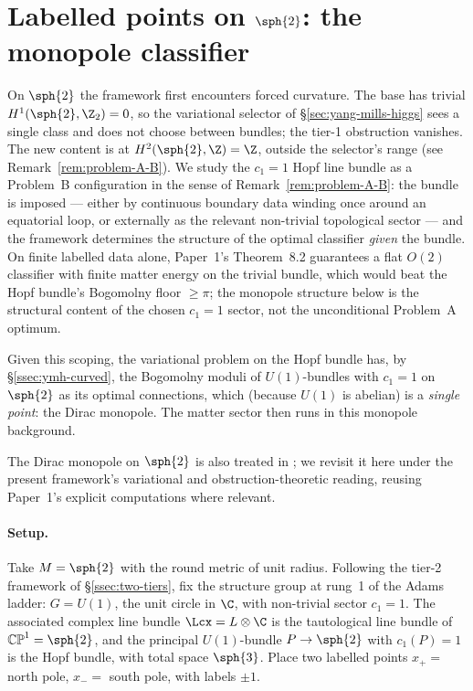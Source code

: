 \section{Labelled points on $\sph{2}$: the monopole classifier}
\label{sec:S2-monopole}

On $\sph{2}$ the framework first encounters forced curvature. The
base has trivial $H^1(\sph{2},\Z_2)=0$, so the variational selector
of \S\ref{sec:yang-mills-higgs} sees a single class and does not
choose between bundles; the tier-1 obstruction vanishes. The new
content is at $H^2(\sph{2},\Z)=\Z$, outside the selector's range
(see Remark~\ref{rem:problem-A-B}). We study the $c_1=1$ Hopf line
bundle as a Problem~B configuration in the sense of
Remark~\ref{rem:problem-A-B}: the bundle is imposed --- either by
continuous boundary data winding once around an equatorial loop, or
externally as the relevant non-trivial topological sector --- and
the framework determines the structure of the optimal classifier
\emph{given} the bundle. On finite labelled data alone, Paper~1's
Theorem~8.2 \cite{Vasii2026Paper1} guarantees a flat $O(2)$
classifier with finite matter energy on the trivial bundle, which
would beat the Hopf bundle's Bogomolny floor $\geq\pi$; the
monopole structure below is the structural content of the chosen
$c_1=1$ sector, not the unconditional Problem~A optimum.

Given this scoping, the variational problem on the Hopf bundle has,
by §\ref{ssec:ymh-curved}, the Bogomolny moduli of $U(1)$-bundles
with $c_1=1$ on $\sph{2}$ as its optimal connections, which
(because $U(1)$ is abelian) is a \emph{single point}: the Dirac
monopole. The matter sector then runs in this monopole background.

The Dirac monopole on $\sph{2}$ is also treated in
\cite[\S 9.3]{Vasii2026Paper1}; we revisit it here under the
present framework's variational and obstruction-theoretic reading,
reusing Paper~1's explicit computations where relevant.

\paragraph{Setup.} Take $M=\sph{2}$ with the round metric of unit
radius. Following the tier-2 framework of \S\ref{ssec:two-tiers},
fix the structure group at rung~1 of the Adams ladder: $G=U(1)$, the
unit circle in $\C$, with non-trivial sector $c_1=1$. The associated
complex line bundle $\Lcx=L\otimes\C$ is the tautological line bundle
of $\mathbb{CP}^1=\sph{2}$, and the principal $U(1)$-bundle $P\to\sph{2}$
with $c_1(P)=1$ is the Hopf bundle, with total space $\sph{3}$.
Place two labelled points $x_+=$ north pole, $x_-=$ south pole, with
labels $\pm 1$.

